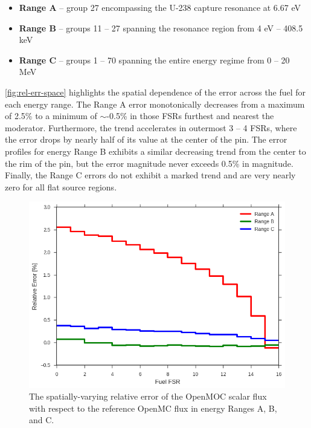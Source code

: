 \begin{itemize}
  \item {\bf Range A} -- group 27 encompassing the U-238 capture resonance at 6.67 eV
  \item {\bf Range B} -- groups 11 -- 27 spanning the resonance region from 4 eV -- 408.5 keV
  \item {\bf Range C} -- groups 1 -- 70 spanning the entire energy regime from 0 -- 20 MeV
\end{itemize}

\autoref{fig:rel-err-space} highlights the spatial dependence of the error across the fuel for each energy range. The Range A error monotonically decreases from a maximum of 2.5\% to a minimum of $\sim$-0.5\% in those FSRs furthest and nearest the moderator. Furthermore,  the trend accelerates in outermost 3 -- 4 FSRs, where the error drops by nearly half of its value at the center of the pin. The error profiles for energy Range B exhibits a similar decreasing trend from the center to the rim of the pin, but the error magnitude never exceeds 0.5\% in magnitude. Finally, the Range C errors do not exhibit a marked trend and are very nearly zero for all flat source regions.


\begin{figure}[h!]
\centering
\includegraphics[width=\linewidth]{figures/rel-err-fuel-fsrs}
\caption{The spatially-varying relative error of the OpenMOC scalar flux with respect to the reference OpenMC flux in energy Ranges A, B, and C.}
\label{fig:rel-err-space}
\end{figure}

